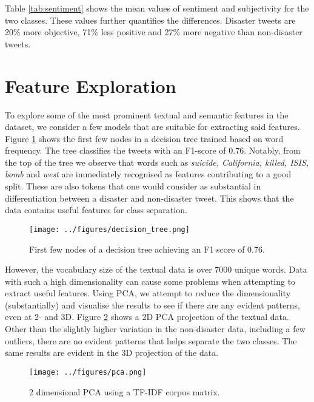 \documentclass[journal, ]{IEEEtran}
\let\MYoriglatexcaption\caption
\renewcommand{\caption}[2][\relax]{\MYoriglatexcaption[#2]{#2}}
\begin{document}
Table \ref{tab:sentiment} shows the mean values of sentiment and
subjectivity for the two classes. These values further quantifies the
differences. Disaster tweets are 20\% more objective, 71\% less positive
and 27\% more negative than non-disaster tweets. 

\section{Feature Exploration}
To explore some of the most prominent textual and semantic features in the
dataset, we consider a few models that are suitable for extracting said
features. Figure \ref{fig:decision_tree} shows the first few nodes in a
decision tree trained based on word frequency. The tree classifies the tweets
with an F1-score of $0.76$. Notably, from the top of the tree we observe that
words such as \textit{suicide, California, killed, ISIS, bomb} and
\textit{west} are immediately recognised as features contributing to a good
split. These are also tokens that one would consider as substantial in
differentiation between a disaster and non-disaster tweet. This shows that the
data contains useful features for class separation.

\begin{figure}[hbt!]
  \centering
  \texttt{[image: ../figures/decision\_tree.png]}
  \caption{First few nodes of a decision tree achieving an F1 score of 0.76.}
  \label{fig:decision_tree}
\end{figure}

However, the vocabulary size of the textual data is over 7000 unique words.
Data with such a high dimensionality can cause some problems when attempting
to extract useful features. Using PCA, we attempt to reduce the dimensionality
(substantially) and visualise the results to see if there are any evident
patterns, even at 2- and 3D. Figure \ref{fig:pca} shows a 2D PCA projection
of the textual data. Other than the slightly higher variation in the
non-disaster data, including a few outliers, there are no evident patterns that
helps separate the two classes. The same results are evident in the 3D
projection of the data. 

\begin{figure}[hbt!]
  \centering
  \texttt{[image: ../figures/pca.png]}
  \caption{2 dimensional PCA using a TF-IDF corpus matrix.}
  \label{fig:pca}
\end{figure}
\end{document}
